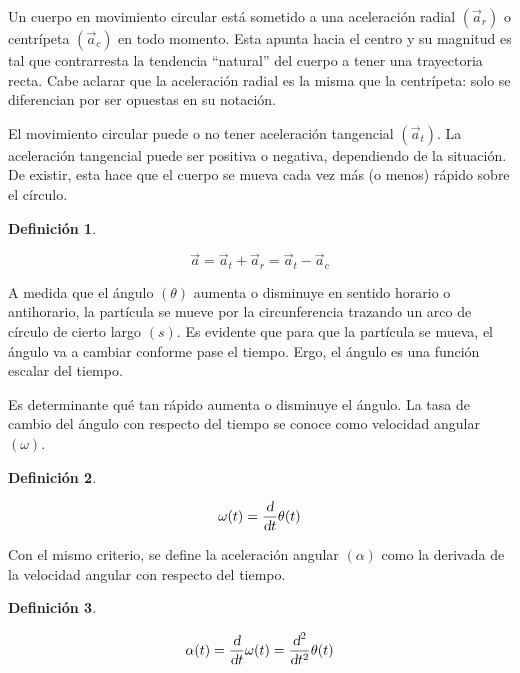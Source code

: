 \documentclass[a5paper,12pt,twoside]{book}
\newtheorem{defn}{{Definición}}[chapter]
\begin{document}
Un cuerpo en movimiento circular está sometido a una aceleración radial $(\vec{a}_r)$ o centrípeta $(\Vec{a}_c)$ en todo momento.
Esta apunta hacia el centro y su magnitud es tal que contrarresta la tendencia ``natural'' del cuerpo a tener una trayectoria recta.
Cabe aclarar que la aceleración radial es la misma que la centrípeta: solo se diferencian por ser opuestas en su notación.

El movimiento circular puede o no tener aceleración tangencial $(\Vec{a}_ t)$.
La aceleración tangencial puede ser positiva o negativa, dependiendo de la situación.
De existir, esta hace que el cuerpo se mueva cada vez más (o menos) rápido sobre el círculo.

\begin{mdframed}[style=MyFrame1]
    \begin{defn}
    \end{defn}
    \begin{equation*}
        \Vec{a} = \Vec{a}_t + \Vec{a}_r = \Vec{a}_t - \Vec{a}_c
    \end{equation*}
\end{mdframed}

A medida que el ángulo $(\theta)$ aumenta o disminuye en sentido horario o antihorario, la partícula se mueve por la circunferencia trazando un arco de círculo de cierto largo $(s)$.
Es evidente que para que la partícula se mueva, el ángulo va a cambiar conforme pase el tiempo.
Ergo, el ángulo es una función escalar del tiempo.

Es determinante qué tan rápido aumenta o disminuye el ángulo.
La tasa de cambio del ángulo con respecto del tiempo se conoce como velocidad angular $(\omega)$.

\begin{mdframed}[style=MyFrame1]
    \begin{defn}
        \label{defn:angularVel}
    \end{defn}
    \begin{equation*}
        \omega (t) = \dfrac{\textsl{d}}{\textsl{d} t} \theta (t)
    \end{equation*}
\end{mdframed}

Con el mismo criterio, se define la aceleración angular $(\alpha)$ como la derivada de la velocidad angular con respecto del tiempo.

\begin{mdframed}[style=MyFrame1]
    \begin{defn}
        \label{defn:angularAccel}
    \end{defn}
    \begin{equation*}
        \alpha (t) = \dfrac{\textsl{d}}{\textsl{d} t} \omega (t) = \dfrac{\textsl{d}^2}{\textsl{d} t^2} \theta (t)
    \end{equation*}
\end{mdframed}
\end{document}
